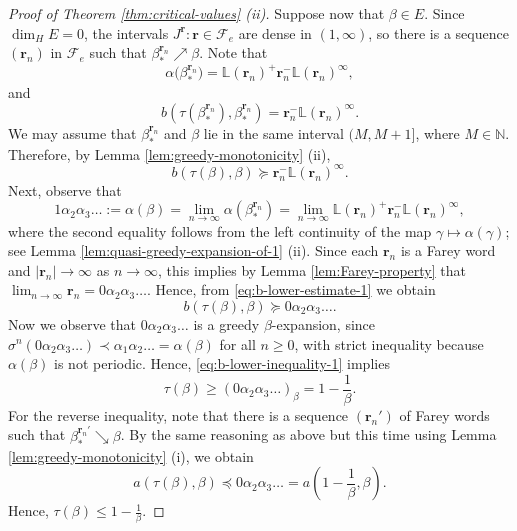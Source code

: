 \documentclass[12pt]{amsart}
\theoremstyle{definition}
\theoremstyle{remark}
\numberwithin{equation}{section}
\newcommand{\N}{\ensuremath{\mathbb{N}}}
\renewcommand{\L}{\ensuremath{\mathbb{L}}}
\newcommand{\cF}{\mathcal{F}}
\renewcommand{\r}{ {\mathbf{r}}}
\newcommand{\f}{\infty}
\newcommand{\al}{\alpha}
\newcommand{\lle}{\preccurlyeq}
\newcommand{\lge}{\succcurlyeq}
\newcommand{\si}{\sigma}
\begin{document}
{\begin{proof}[Proof of Theorem \ref{thm:critical-values} (ii)]
Suppose now that $\beta\in E$. Since $\dim_H E=0$, the intervals $J^\r: \r\in \cF_e$ are dense in $(1,\f)$, so there is a sequence $(\r_n)$ in $\cF_e$ such that $\beta_*^{\r_n}\nearrow\beta$. Note that
\[
\al\big(\beta_*^{\r_n}\big)=\L(\r_n)^+\r_n^-\L(\r_n)^\f,
\]
and
\[
b\left(\tau(\beta_*^{\r_n}),\beta_*^{\r_n}\right)=\r_n^-\L(\r_n)^\f.
\]
We may assume that $\beta_*^{\r_n}$ and $\beta$ lie in the same interval $(M,M+1]$, where $M\in\N$.
Therefore, by Lemma \ref{lem:greedy-monotonicity} (ii),
\begin{equation} \label{eq:b-lower-estimate-1}
b(\tau(\beta),\beta)\lge \r_n^-\L(\r_n)^\f.
\end{equation}
Next, observe that
\begin{equation*}
1\al_2\al_3\dots:=\al(\beta)=\lim_{n\to\f}\al(\beta_*^{\r_n})=\lim_{n\to\f}\L(\r_n)^+\r_n^-\L(\r_n)^\f,
\end{equation*}
where the second equality follows from the left continuity of the map $\gamma\mapsto \al(\gamma)$; see Lemma \ref{lem:quasi-greedy-expansion-of-1} (ii).
Since each $\r_n$ is a Farey word and $|\r_n|\to\f$ as $n\to\f$, this implies by Lemma \ref{lem:Farey-property} that $\lim_{n\to\f}\r_n=0\al_2\al_3\dots$. Hence, from \eqref{eq:b-lower-estimate-1} we obtain
\begin{equation} \label{eq:b-lower-inequality-1}
b(\tau(\beta),\beta)\lge 0\al_2\al_3\dots.
\end{equation}
Now we observe that $0\al_2\al_3\dots$ is a greedy $\beta$-expansion, since $\si^n(0\al_2\al_3\dots)\prec\al_1\al_2\dots=\al(\beta)$ for all $n\geq 0$, with strict inequality because $\al(\beta)$ is not periodic. Hence, \eqref{eq:b-lower-inequality-1} implies
\[
\tau(\beta)\geq (0\al_2\al_3\dots)_\beta=1-\frac{1}{\beta}.
\]
For the reverse inequality, note that there is a sequence $(\r_n')$ of Farey words such that $\beta_*^{\r_n'}\searrow\beta$. By the same reasoning as above but this time using Lemma \ref{lem:greedy-monotonicity} (i), we obtain
\[
a(\tau(\beta),\beta)\lle 0\al_2\al_3\dots=a\left(1-\frac{1}{\beta},\beta\right).
\]
Hence, $\tau(\beta)\leq 1-\frac{1}{\beta}$.


\end{proof}}
\end{document}

